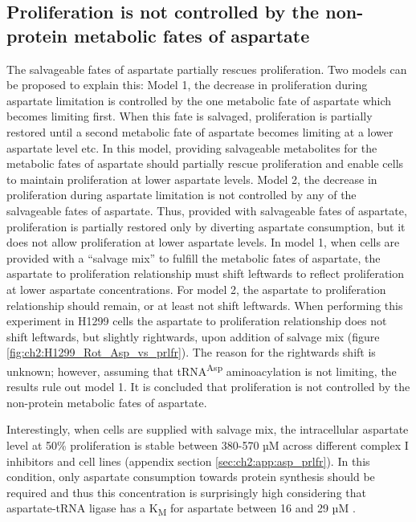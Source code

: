 \subsection{Proliferation is not controlled by the non-protein metabolic fates of aspartate}
The salvageable fates of aspartate partially rescues proliferation.
Two models can be proposed to explain this:
Model 1, the decrease in proliferation during aspartate limitation is controlled by the one metabolic fate of aspartate which becomes limiting first.
When this fate is salvaged, proliferation is partially restored until a second metabolic fate of aspartate becomes limiting at a lower aspartate level etc.
In this model, providing salvageable metabolites for the metabolic fates of aspartate should partially rescue proliferation and enable cells to maintain proliferation at lower aspartate levels.
Model 2, the decrease in proliferation during aspartate limitation is not controlled by any of the salvageable fates of aspartate.
Thus, provided with salvageable fates of aspartate, proliferation is partially restored only by diverting aspartate consumption, but it does not allow proliferation at lower aspartate levels.
In model 1, when cells are provided with a ``salvage mix'' to fulfill the metabolic fates of aspartate, the aspartate to proliferation relationship must shift leftwards to reflect proliferation at lower aspartate concentrations.
For model 2, the aspartate to proliferation relationship should remain, or at least not shift leftwards.
When performing this experiment in H1299 cells the aspartate to proliferation relationship does not shift leftwards, but slightly rightwards, upon addition of salvage mix (figure \ref{fig:ch2:H1299_Rot_Asp_vs_prlfr}).
The reason for the rightwards shift is unknown; however, assuming that tRNA\textsuperscript{Asp} aminoacylation is not limiting, the results rule out model 1.
It is concluded that proliferation is not controlled by the non-protein metabolic fates of aspartate.

Interestingly, when cells are supplied with salvage mix, the intracellular aspartate level at 50\% proliferation is stable between 380-570 µM across different complex I inhibitors and cell lines (appendix section \ref{sec:ch2:app:asp_prlfr}).
In this condition, only aspartate consumption towards protein synthesis should be required and thus this concentration is surprisingly high considering that aspartate-tRNA ligase has a K\textsubscript{M} for aspartate between 16 and 29 µM \cite{Bour2009-fx, Escalante1993-jy, Messmer2009-xm}.

